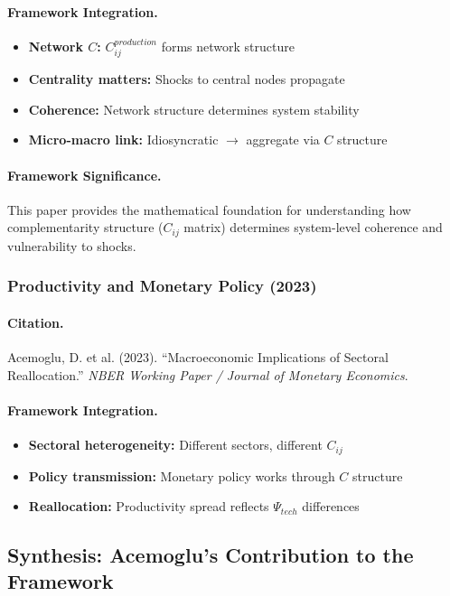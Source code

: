 \paragraph{Framework Integration.}
\begin{itemize}
  \item \textbf{Network $C$:} $C_{ij}^{production}$ forms network structure
  \item \textbf{Centrality matters:} Shocks to central nodes propagate
  \item \textbf{Coherence:} Network structure determines system stability
  \item \textbf{Micro-macro link:} Idiosyncratic $\to$ aggregate via $C$ structure
\end{itemize}

\paragraph{Framework Significance.}
This paper provides the mathematical foundation for understanding
how complementarity structure ($C_{ij}$ matrix) determines system-level
coherence and vulnerability to shocks.

\subsubsection{Productivity and Monetary Policy (2023)}

\paragraph{Citation.}
Acemoglu, D. et al. (2023).
``Macroeconomic Implications of Sectoral Reallocation.''
\emph{NBER Working Paper / Journal of Monetary Economics}.

\paragraph{Framework Integration.}
\begin{itemize}
  \item \textbf{Sectoral heterogeneity:} Different sectors, different $C_{ij}$
  \item \textbf{Policy transmission:} Monetary policy works through $C$ structure
  \item \textbf{Reallocation:} Productivity spread reflects $\Psi_{tech}$ differences
\end{itemize}

\subsection{Synthesis: Acemoglu's Contribution to the Framework}

